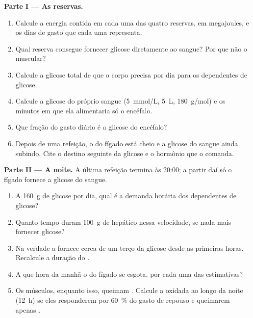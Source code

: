 \begin{problem}
\medskip
\noindent\textbf{Parte I --- As reservas.}
\begin{enumerate}
  \item Calcule a energia contida em cada uma das quatro reservas, em
        megajoules, e os dias de gasto que cada uma representa.
  \item Qual reserva consegue fornecer glicose diretamente ao sangue?
        Por que não o  muscular?
  \item Calcule a glicose total de que o corpo precisa por dia para os
         dependentes de glicose.
  \item Calcule a glicose do próprio sangue (\qty{5}{mmol/L},
        \qty{5}{L}, \qty{180}{g/mol}) e os minutos em que ela
        alimentaria só o encéfalo.
  \item Que fração do gasto diário é a glicose do encéfalo?
  \item Depois de uma refeição, o  do fígado está cheio e a
        glicose do sangue ainda subindo. Cite o destino seguinte da
        glicose e o hormônio que o comanda.
\end{enumerate}

\medskip
\noindent\textbf{Parte II --- A noite.}
A última refeição termina às 20:00; a partir daí só o fígado fornece a
glicose do sangue.
\begin{enumerate}[resume]
  \item A \qty{160}{g} de glicose por dia, qual é a demanda horária dos
         dependentes de glicose?
  \item Quanto tempo duram \qty{100}{g} de  hepático nessa
        velocidade, se nada mais fornecer glicose?
  \item Na verdade a  fornece cerca de um terço da glicose
        desde as primeiras horas. Recalcule a duração do .
  \item A que hora da manhã o  do fígado se esgota, por cada
        uma das estimativas?
  \item Os músculos, enquanto isso, queimam . Calcule a
         oxidada ao longo da noite (\qty{12}{h}) se eles
        responderem por \qty{60}{\%} do gasto de repouso e queimarem
        apenas .
\end{enumerate}


\end{problem}
